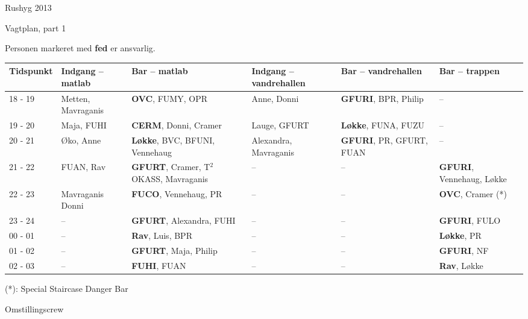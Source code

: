 \documentclass[danish,a4paper,11pt,oneside,article]{memoir}
\begin{document}
\begin{center}
  \noindent \huge Rushyg 2013 \normalsize
\end{center}

\bigskip

\noindent \LARGE Vagtplan, part 1 \normalsize

\medskip

\noindent Personen markeret med \textbf{fed} er ansvarlig.

\bigskip

\begin{table}[h!]
  \centering
  \hspace*{-1.3cm}\begin{tabular}{l|p{3.4cm}p{6.9cm}p{4.3cm}p{4.7cm}l}
    \toprule
    \textbf{Tidspunkt} & \textbf{Indgang -- matlab} & \textbf{Bar -- matlab} &
    \textbf{Indgang -- vandrehallen} & \textbf{Bar -- vandrehallen} &
    \textbf{Bar -- trappen} \\
    \midrule
    18 - 19 & Metten, Mavraganis & \textbf{OVC}, FUMY, OPR  & Anne,
    Donni  & \textbf{GFURI}, BPR, Philip  & --  \\
    19 - 20 & Maja, FUHI & \textbf{CERM}, Donni, Cramer  & Lauge, GFURT
    & \textbf{Løkke}, FUNA, FUZU  & --  \\
    20 - 21 & Øko, Anne & \textbf{Løkke}, BVC, BFUNI, Vennehaug  &
    Alexandra, Mavraganis & \textbf{GFURI}, PR, GFURT, FUAN  & --  \\
    21 - 22 & FUAN, Rav & \textbf{GFURT}, Cramer, T$^2$OKASS, Mavraganis
    & -- & --  & \textbf{GFURI}, Vennehaug, Løkke \\
    22 - 23 & Mavraganis Donni & \textbf{FUCO}, Vennehaug, PR  & -- &
    --  & \textbf{OVC}, Cramer (*)  \\
    23 - 24 & -- & \textbf{GFURT}, Alexandra, FUHI  & -- & --  &
    \textbf{GFURI}, FULO  \\
    00 - 01 & -- & \textbf{Rav}, Luis, BPR   & -- & -- &
    \textbf{Løkke}, PR  \\
    01 - 02 & -- & \textbf{GFURT}, Maja, Philip  & -- & --  &
    \textbf{GFURI}, NF  \\
    02 - 03 & -- & \textbf{FUHI}, FUAN  & -- & --  & \textbf{Rav}, Løkke  \\
    \bottomrule
  \end{tabular}
\end{table}

\noindent (*): Special Staircase Danger Bar

\strut\vfill \noindent \LARGE Omstillingscrew \normalsize
\end{document}
